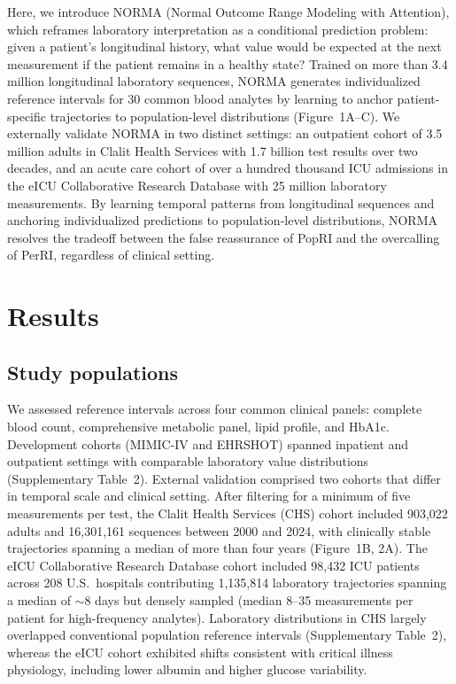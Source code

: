 \documentclass[11pt]{article}
\begin{document}
Here, we introduce NORMA (Normal Outcome Range Modeling with Attention), which reframes laboratory interpretation as a conditional prediction problem: given a patient's longitudinal history, what value would be expected at the next measurement if the patient remains in a healthy state? Trained on more than 3.4 million longitudinal laboratory sequences, NORMA generates individualized reference intervals for 30 common blood analytes by learning to anchor patient-specific trajectories to population-level distributions (Figure~1A--C). We externally validate NORMA in two distinct settings: an outpatient cohort of 3.5 million adults in Clalit Health Services with 1.7 billion test results over two decades, and an acute care cohort of over a hundred thousand ICU admissions in the eICU Collaborative Research Database with 25 million laboratory measurements. By learning temporal patterns from longitudinal sequences and anchoring individualized predictions to population-level distributions, NORMA resolves the tradeoff between the false reassurance of PopRI and the overcalling of PerRI, regardless of clinical setting.



\section*{Results}

\subsection*{Study populations}

We assessed reference intervals across four common clinical panels: complete blood count, comprehensive metabolic panel, lipid profile, and HbA1c. Development cohorts (MIMIC-IV and EHRSHOT) spanned inpatient and outpatient settings with comparable laboratory value distributions (Supplementary Table~2). External validation comprised two cohorts that differ in temporal scale and clinical setting. After filtering for a minimum of five measurements per test, the Clalit Health Services (CHS) cohort included 903,022 adults and 16,301,161 sequences between 2000 and 2024, with clinically stable trajectories spanning a median of more than four years (Figure~1B, 2A). The eICU Collaborative Research Database cohort included 98,432 ICU patients across 208 U.S.\ hospitals contributing 1,135,814 laboratory trajectories spanning a median of $\sim$8 days but densely sampled (median 8--35 measurements per patient for high-frequency analytes). Laboratory distributions in CHS largely overlapped conventional population reference intervals (Supplementary Table~2), whereas the eICU cohort exhibited shifts consistent with critical illness physiology, including lower albumin and higher glucose variability.
\end{document}
